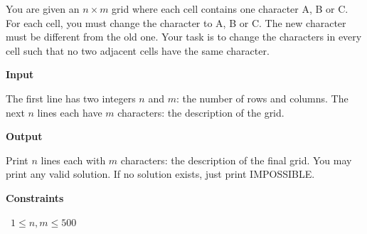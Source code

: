 You are given an $n\times m$ grid where each cell contains one character A, B or C.
For each cell, you must change the character to A, B or C. The new character must be different from the old one.
Your task is to change the characters in every cell such that no two adjacent cells have the same character.

\vspace{0.3cm}\noindent\textbf{Input}

The first line has two integers $n$ and $m$: the number of rows and columns.
The next $n$ lines each have $m$ characters: the description of the grid.

\vspace{0.3cm}\noindent\textbf{Output}

Print $n$ lines each with $m$ characters: the description of the final grid.
You may print any valid solution.
If no solution exists, just print IMPOSSIBLE.

\vspace{0.3cm}\noindent\textbf{Constraints}

\textbullet\ $1 \le n, m \le 500$